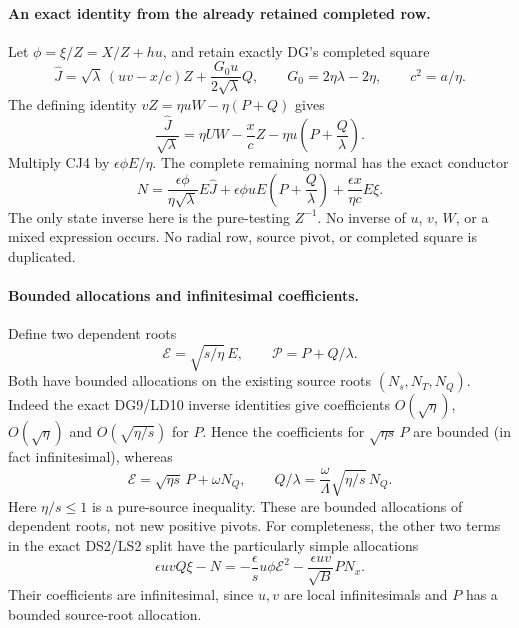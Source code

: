 \paragraph{An exact identity from the already retained completed row.}
Let $\phi=\xi/Z=X/Z+hu$, and retain exactly DG's completed square
\[
 \widehat J=\sqrt\lambda\,(uv-x/c)Z
       +\frac{G_0u}{2\sqrt\lambda}Q,
 \qquad G_0=2\eta\lambda-2\eta,\qquad c^2=a/\eta.
\]
The defining identity $vZ=\eta uW-\eta(P+Q)$ gives
\[
 \boxed{\quad
 \frac{\widehat J}{\sqrt\lambda}
 =\eta U W-\frac{x}{c}Z
                -\eta u\left(P+\frac Q\lambda\right).
 \quad}                                                       \tag{CJ4}
\]
Multiply CJ4 by $\epsilon\phi E/\eta$.  The complete remaining
normal has the exact conductor
\[
 \boxed{\quad
 N=\frac{\epsilon\phi}{\eta\sqrt\lambda}E\widehat J
       +\epsilon\phi uE\left(P+\frac Q\lambda\right)
       +\frac{\epsilon x}{\eta c}E\xi .
 \quad}                                                       \tag{CJ5}
\]
The only state inverse here is the pure-testing $Z^{-1}$.  No inverse
of $u$, $v$, $W$, or a mixed expression occurs.  No radial row, source
pivot, or completed square is duplicated.

\paragraph{Bounded allocations and infinitesimal coefficients.}
Define two dependent roots
\[
 \mathcal E=\sqrt{s/\eta}\,E,
 \qquad \mathcal P=P+Q/\lambda.
\]
Both have bounded allocations on the existing source roots
$(N_s,N_T,N_Q)$.  Indeed the exact DG9/LD10 inverse identities give
coefficients $O(\sqrt\eta)$, $O(\sqrt\eta)$ and
$O(\sqrt{\eta/s})$ for $P$.  Hence the coefficients for
$\sqrt{\eta s}\,P$ are bounded (in fact infinitesimal), whereas
\[
 \mathcal E=\sqrt{\eta s}\,P+\omega N_Q,
 \qquad
 Q/\lambda=\frac{\omega}{\Lambda}\sqrt{\eta/s}\,N_Q.
                                                               \tag{CJ6}
\]
Here $\eta/s\le1$ is a pure-source inequality.  These are bounded
allocations of dependent roots, not new positive pivots.
For completeness, the other two terms in the exact DS2/LS2 split
have the particularly simple allocations
\[
 \epsilon uvQ\xi-N
   =-\frac{\epsilon}{s}u\phi\mathcal E^2
     -\frac{\epsilon uv}{\sqrt B}PN_x.               \tag{CJ6a}
\]
Their coefficients are infinitesimal, since $u,v$ are local
infinitesimals and $P$ has a bounded source-root allocation.

